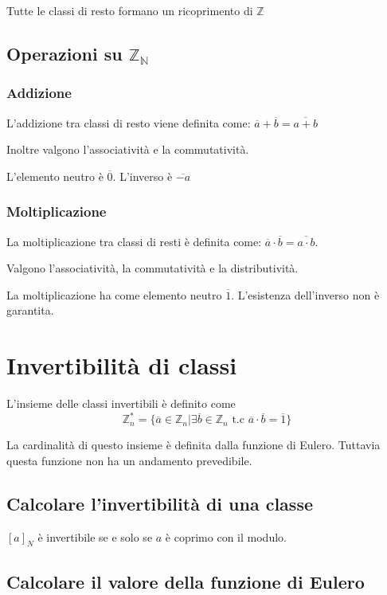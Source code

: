 \documentclass[a4paper, 10pt]{article}
\begin{document}
Tutte le classi di resto formano un ricoprimento di $\mathbb{Z}$

\subsection{Operazioni su $\mathbb{Z_N}$}

\subsubsection{Addizione}

L'addizione tra classi di resto viene definita come: $\overline{a} + \overline{b} = \overline{a+b}$

Inoltre valgono l'associatività e la commutatività.

L'elemento neutro è $\overline{0}$. L'inverso è $\overline{-a}$

\subsubsection{Moltiplicazione}

La moltiplicazione tra classi di resti è definita come: $\overline{a} \cdot \overline{b} = \overline{a \cdot b}$.

Valgono l'associatività, la commutatività e la distributività.

La moltiplicazione ha come elemento neutro $\overline{1}$. L'esistenza dell'inverso non è garantita.

\section{Invertibilità di classi}

L'insieme delle classi invertibili è definito come $$\mathbb{Z}_n^* = \{\overline{a} \in \mathbb{Z}_n | \exists \overline{b} \in \mathbb{Z}_n \text{ t.c } \overline{a} \cdot \overline{b} = \overline{1}\}$$

La cardinalità di questo insieme è definita dalla funzione di Eulero. Tuttavia questa funzione non ha un andamento prevedibile.

\subsection{Calcolare l'invertibilità di una classe}

$[a]_N$ è invertibile se e solo se $a$ è coprimo con il modulo.

\subsection{Calcolare il valore della funzione di Eulero}
\end{document}
